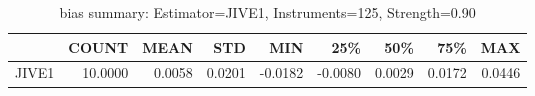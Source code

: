 \begin{table}[ht]
\centering
\caption{bias summary: Estimator=JIVE1, Instruments=125, Strength=0.90}
\begin{tabular}{lrrrrrrrr}
\toprule
 & COUNT & MEAN & STD & MIN & 25\% & 50\% & 75\% & MAX \\
\midrule
JIVE1 & 10.0000 & 0.0058 & 0.0201 & -0.0182 & -0.0080 & 0.0029 & 0.0172 & 0.0446 \\
\bottomrule
\end{tabular}
\end{table}
